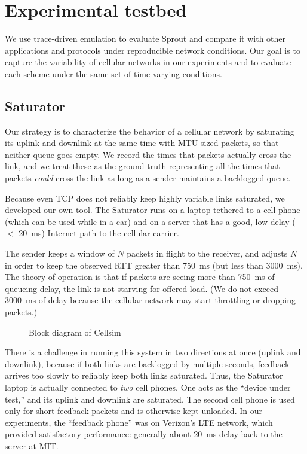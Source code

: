 \section{Experimental testbed}
\label{s:impl}
\label{ss:platform}
We use trace-driven emulation to evaluate Sprout and compare it with
other applications and protocols under reproducible network
conditions. Our goal is to capture the variability of cellular
networks in our experiments and to evaluate each scheme under the same
set of time-varying conditions.

\subsection{Saturator} Our strategy is to characterize the behavior
of a cellular network by saturating its uplink and downlink at the
same time with MTU-sized packets, so that neither queue goes empty. We
record the times that packets actually cross the link, and we treat
these as the ground truth representing all the times that packets
\emph{could} cross the link as long as a sender maintains a backlogged
queue.

\label{ss:saturator}

Because even TCP does not reliably keep highly variable links
saturated, we developed our own tool. The Saturator runs on a laptop
tethered to a cell phone (which can be used while in a car) and on a
server that has a good, low-delay ($<$ 20~ms) Internet path to the
cellular carrier.

The sender keeps a window of $N$ packets in flight to the receiver,
and adjusts $N$ in order to keep the observed RTT greater than 750~ms
(but less than 3000~ms). The theory of operation is that if packets
are seeing more than 750~ms of queueing delay, the link is not
starving for offered load. (We do not exceed 3000~ms of delay because
the cellular network may start throttling or dropping packets.)

\begin{figure}
  \caption{Block diagram of Cellsim}
\hspace{\baselineskip}

\noindent \def\svgwidth{\columnwidth}

\label{f:cellsim}

\end{figure}

There is a challenge in running this system in two directions at once
(uplink and downlink), because if both links are backlogged by
multiple seconds, feedback arrives too slowly to reliably keep both
links saturated. Thus, the Saturator laptop is actually connected to
\emph{two} cell phones. One acts as the ``device under test,'' and its
uplink and downlink are saturated.  The second cell phone is used only
for short feedback packets and is otherwise kept unloaded. In our
experiments, the ``feedback phone'' was on Verizon's LTE network,
which provided satisfactory performance: generally about 20~ms delay
back to the server at MIT.

